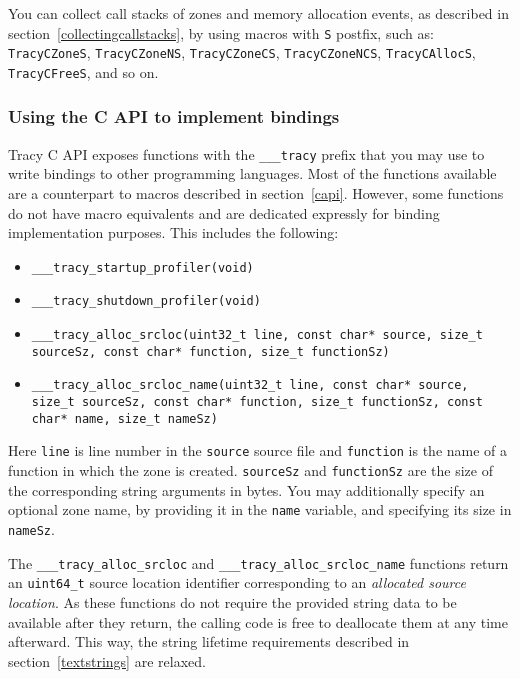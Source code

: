 \documentclass[hidelinks,titlepage,a4paper,twoside]{article}
\begin{document}
You can collect call stacks of zones and memory allocation events, as described in section~\ref{collectingcallstacks}, by using macros with \texttt{S} postfix, such as: \texttt{TracyCZoneS}, \texttt{TracyCZoneNS}, \texttt{TracyCZoneCS}, \texttt{TracyCZoneNCS}, \texttt{TracyCAllocS}, \texttt{TracyCFreeS}, and so on.

\subsubsection{Using the C API to implement bindings}
\label{capibindings}

Tracy C API exposes functions with the \texttt{\_\_\_tracy} prefix that you may use to write bindings to other programming languages. Most of the functions available are a counterpart to macros described in section~\ref{capi}. However, some functions do not have macro equivalents and are dedicated expressly for binding implementation purposes. This includes the following:

\begin{itemize}
\item \texttt{\_\_\_tracy\_startup\_profiler(void)}
\item \texttt{\_\_\_tracy\_shutdown\_profiler(void)}
\item \texttt{\_\_\_tracy\_alloc\_srcloc(uint32\_t line, const char* source, size\_t sourceSz, const char* function, size\_t functionSz)}
\item \texttt{\_\_\_tracy\_alloc\_srcloc\_name(uint32\_t line, const char* source, size\_t sourceSz, const char* function, size\_t functionSz, const char* name, size\_t nameSz)}
\end{itemize}

Here \texttt{line} is line number in the \texttt{source} source file and \texttt{function} is the
name of a function in which the zone is created. \texttt{sourceSz} and \texttt{functionSz} are the
size of the corresponding string arguments in bytes. You may additionally specify an optional zone
name, by providing it in the \texttt{name} variable, and specifying its size in \texttt{nameSz}.

The \texttt{\_\_\_tracy\_alloc\_srcloc} and \texttt{\_\_\_tracy\_alloc\_srcloc\_name} functions
return an \texttt{uint64\_t} source location identifier corresponding to an \emph{allocated source
location}. As these functions do not require the provided string data to be available after they
return, the calling code is free to deallocate them at any time afterward. This way, the string
lifetime requirements described in section~\ref{textstrings} are relaxed.
\end{document}
